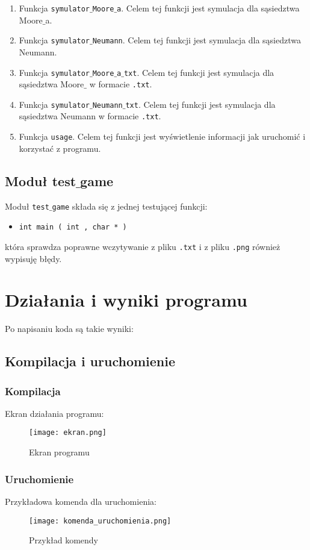 \documentclass[a4paper, 12pt]{article}
\begin{document}
		\begin{enumerate}
			\item Funkcja \texttt{symulator$\_$Moore$\_$a}. 
			Celem tej funkcji jest symulacja dla sąsiedztwa Moore$\_$a.
			\item Funkcja \texttt{symulator$\_$Neumann}. 
			Celem tej funkcji jest symulacja dla sąsiedztwa Neumann.
			\item Funkcja \texttt{symulator$\_$Moore$\_$a$\_$txt}. 
			Celem tej funkcji jest symulacja dla sąsiedztwa Moore$\_$ w formacie \texttt{.txt}.
			\item Funkcja \texttt{symulator$\_$Neumann$\_$txt}. 
			Celem tej funkcji jest symulacja dla sąsiedztwa Neumann w formacie \texttt{.txt}.
			\item Funkcja \texttt{usage}. 
			Celem tej funkcji jest wyświetlenie informacji jak uruchomić i korzystać z programu.
		\end{enumerate}
		
		\subsection{Moduł test$\_$game}
			\hspace*{1cm} Moduł \texttt{test$\_$game} składa się z jednej testującej funkcji:
		\begin{itemize}
			\item \texttt{int main ( int , char * )}
		\end{itemize}		 
		która sprawdza poprawne wczytywanie z pliku \texttt{.txt} i z pliku \texttt{.png} również wypisuję błędy.
\newpage
	\section{Działania i wyniki programu}
			\hspace*{1cm} Po napisaniu koda są takie wyniki:
		\subsection{Kompilacja i uruchomienie}
			\subsubsection{Kompilacja}
			\hspace*{1cm} Ekran działania programu:
		\begin{figure}[h]
			\texttt{[image: ekran.png]}
			\caption{Ekran programu}
		\end{figure}	
			\subsubsection{Uruchomienie}
			\hspace*{1cm} Przykładowa komenda dla uruchomienia:
		\begin{figure}[h]
			\texttt{[image: komenda\_uruchomienia.png]}
			\caption{Przykład komendy}
		\end{figure}	
\newpage
\end{document}
